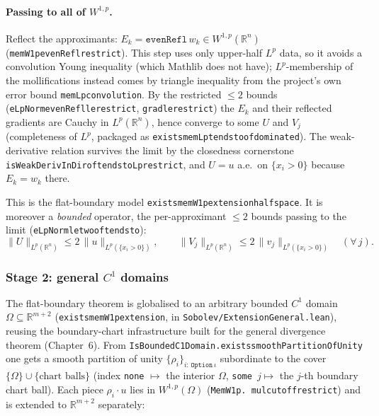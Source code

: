 ﻿\documentclass[12pt, a4paper]{article}
\renewcommand{\_}{\origunderscore\allowbreak}
\theoremstyle{definition}
\theoremstyle{plain}
\begin{document}
\paragraph{Passing to all of $W^{1,p}$.}  Reflect the approximants: $E_k=\texttt{evenRefl}\,w_k\in
W^{1,p}(\mathbb R^n)$ (\texttt{memW1p\_evenRefl\_restrict}).  This step uses only upper-half $L^p$ data,
so it avoids a convolution Young inequality (which Mathlib does not have); $L^p$-membership of the
mollifications instead comes by triangle inequality from the project's own error bound
\texttt{memLp\_convolution}.  By the restricted $\le2$ bounds (\texttt{eLpNorm\_evenRefl\_le\_restrict},
\texttt{\_grad\_le\_restrict}) the $E_k$ and their reflected gradients are Cauchy in $L^p(\mathbb R^n)$,
hence converge to some $U$ and $V_j$ (completeness of $L^p$, packaged as
\texttt{exists\_memLp\_tendsto\_of\_dominated}).  The weak-derivative relation survives the limit by the
closedness cornerstone \texttt{isWeakDerivInDir\_of\_tendsto\_Lp\_restrict}, and $U=u$ a.e.\ on
$\{x_i>0\}$ because $E_k=w_k$ there.

This is the flat-boundary model \texttt{exists\_memW1p\_extension\_halfspace}.  It is moreover a
\emph{bounded} operator, the per-approximant $\le2$ bounds passing to the limit
(\texttt{eLpNorm\_le\_two\_of\_tendsto}):
\[
  \|U\|_{L^p(\mathbb R^n)}\le 2\,\|u\|_{L^p(\{x_i>0\})},
  \qquad
  \|V_j\|_{L^p(\mathbb R^n)}\le 2\,\|v_j\|_{L^p(\{x_i>0\})}\quad(\forall\, j).
\]

\subsubsection*{Stage 2: general $C^1$ domains}

The flat-boundary theorem is globalised to an arbitrary bounded $C^1$ domain
$\Omega\subseteq\mathbb R^{m+2}$ (\texttt{exists\_memW1p\_extension}, in
\texttt{Sobolev/\allowbreak Extension\allowbreak General.\allowbreak lean}), reusing the
boundary-chart infrastructure built for the general divergence theorem (Chapter~6).  From
\texttt{IsBoundedC1Domain.\allowbreak exists\_smoothPartitionOfUnity} one gets a smooth partition of unity
$\{\rho_i\}_{i:\,\texttt{Option}\,\iota}$ subordinate to the cover $\{\Omega\}\cup\{\text{chart balls}\}$
(index \texttt{none} $\mapsto$ the interior $\Omega$, \texttt{some}~$j\mapsto$ the $j$-th boundary
chart ball).  Each piece $\rho_i\!\cdot\!u$ lies in $W^{1,p}(\Omega)$ (\texttt{MemW1p.\allowbreak
mul\_cutoff\_restrict}) and is extended to $\mathbb R^{m+2}$ separately:
\end{document}
